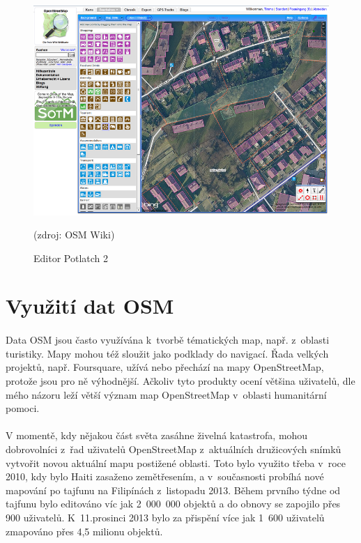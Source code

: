 \documentclass[11pt,a4paper,titlepage,oneside]{book}
\begin{document}
		\begin{figure}[!h]
			\begin{center}
				\includegraphics[width=12cm]{obrazky/p2_osm.png}
				\caption{Editor Potlatch 2}(zdroj: OSM Wiki\cite{wiki_p2})
			\end{center}
		\end{figure}

	\section{Využití dat \ac{OSM}}
		\paragraph{} Data \ac{OSM} jsou často využívána k~tvorbě tématických map, např. z~oblasti turistiky. Mapy mohou též sloužit jako podklady do navigací. Řada velkých projektů, např. Foursquare, užívá nebo přechází na mapy OpenStreetMap, protože jsou pro ně výhodnější. Ačkoliv tyto produkty ocení většina uživatelů, dle mého názoru leží větší význam map OpenStreetMap v~oblasti humanitární pomoci.
		\paragraph{}V momentě, kdy nějakou část světa zasáhne živelná katastrofa, mohou dobrovolníci z~řad uživatelů OpenStreetMap z~aktuálních družicových snímků vytvořit novou aktuální mapu postižené oblasti. Toto bylo využito třeba v~roce 2010, kdy bylo Haiti zasaženo zemětřesením, a v~současnosti probíhá nové mapování po tajfunu na Filipínách z~listopadu 2013. Během prvního týdne od tajfunu bylo editováno víc jak 2~000~000 objektů a do obnovy se zapojilo přes 900 uživatelů. K~11.prosinci 2013 bylo za přispění více jak 1~600 uživatelů zmapováno přes 4,5 milionu objektů\cite{wiki_tajfun}.
\end{document}
